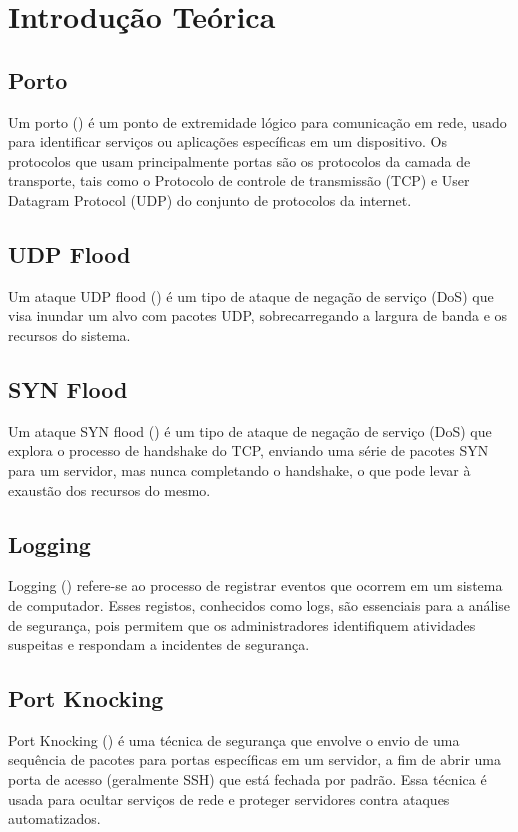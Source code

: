 \documentclass[a4paper]{article}
\begin{document}
\newpage
\section{Introdução Teórica}\label{theory}
\subsection{Porto}
Um porto (\cite{port}) é um ponto de extremidade lógico para comunicação em rede, usado para identificar serviços ou aplicações específicas em um dispositivo.
Os protocolos que usam principalmente portas são os protocolos da camada de transporte, tais como o Protocolo de controle de transmissão (TCP)
e User Datagram Protocol (UDP) do conjunto de protocolos da internet.

\subsection{UDP Flood}
Um ataque UDP flood (\cite{udpflood}) é um tipo de ataque de negação de serviço (DoS) que visa inundar um alvo com pacotes UDP,
sobrecarregando a largura de banda e os recursos do sistema.

\subsection{SYN Flood}
Um ataque SYN flood (\cite{synflood}) é um tipo de ataque de negação de serviço (DoS) que explora o processo de handshake do TCP,
enviando uma série de pacotes SYN para um servidor, mas nunca completando o handshake, o que pode levar à exaustão dos recursos do mesmo.

\subsection{Logging}
Logging (\cite{logging}) refere-se ao processo de registrar eventos que ocorrem em um sistema de computador.
Esses registos, conhecidos como logs, são essenciais para a análise de segurança,
pois permitem que os administradores identifiquem atividades suspeitas e respondam a incidentes de segurança.

\newpage
\subsection{Port Knocking}
Port Knocking (\cite{portknocking}) é uma técnica de segurança que envolve o envio de uma sequência de pacotes para portas específicas em um servidor,
a fim de abrir uma porta de acesso (geralmente SSH) que está fechada por padrão. Essa técnica é usada para ocultar
serviços de rede e proteger servidores contra ataques automatizados.
\end{document}
